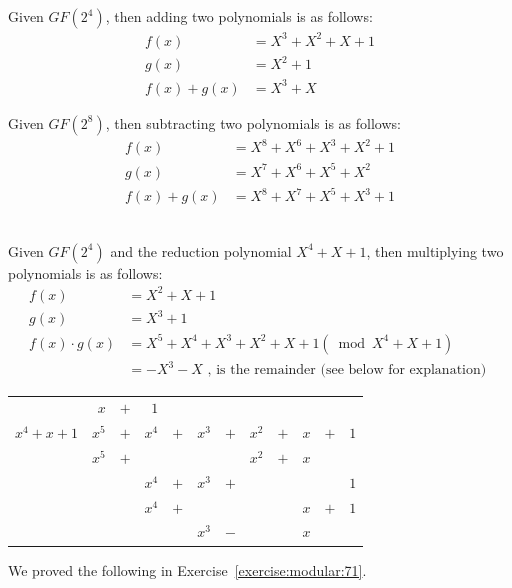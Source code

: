 \begin{eg} Given $GF(2^4)$, then adding two polynomials is as follows:
\begin{align*}
	f(x) &= X^3 + X^2 + X + 1\\
	g(x) &= X^2  + 1\\
           f(x) + g(x) &= X^3  + X
\end{align*}
\end{eg}

\begin{eg} Given $GF(2^8)$, then subtracting two polynomials is as follows:
\begin{align*}	
	f(x) &= X^8 +         X^6 +          X^3 + X^2 + 1\\
	g(x) &=        X^7 + X^6 + X^5 +          X^2\\
 f(x) + g(x) &= X^8 + X^7 +        X^5  + X^3  +         1
\end{align*}
\\
\end{eg}

\begin{eg} Given $GF(2^4)$ and the reduction polynomial $X^4 + X + 1$, then multiplying two polynomials is as follows:
\begin{align*}	
	f(x) &=  X^2 + X + 1\\
	g(x) &= X^3 + 1\\
 f(x) \cdot g(x) &= X^5 + X^4 + X^3 + X^2 + X + 1 (\bmod X^4 + X + 1)\\ 
	       &= - X^3 - X \text{ , is the remainder (see below for explanation) }
\end{align*}
\begin{center}
\begin{tabular}{rrcrcrcrcrcr}
        &  $x$  &  $+$  &      $1$         \\ \cline{2-12}
 \multicolumn{1}{r|}{$x^4 + x + 1$}
        &  $x^5$  &  $+$  &  $x^4$  &  $+$  & $ x^3$  &  $+$  &  $x^2$  &  $+$  & $ x$  &  $+$  &  $1$  \\
        & $x^5$   &  $+$  &       	&          &      	  &          &  $x^2$   & $+$  &  $x$     \\ \cline{2-12}
        &         &       &         $x^4$  & $+$   &  $ x^3$  &   $+$  &             &         &         &          &  $1$  \\
        &         &       &         $x^4$  &  $+$  &             &           &              &         &  $x$   & $+$  &  $1$   \\ \cline{4-12}
        &         &       &                    &          &   $x^3$ &    $-$  &              &         &  $x$    
\end{tabular}
\end{center}
\end{eg}
We proved the following in Exercise~\ref{exercise:modular:71}.

